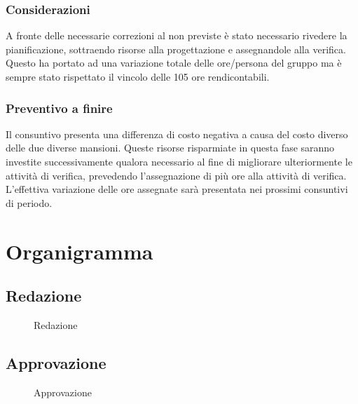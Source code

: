 \subsubsection{Considerazioni}
A fronte delle necessarie correzioni al \PdQ{} non previste è stato necessario rivedere la pianificazione, sottraendo risorse alla progettazione e assegnandole alla verifica. Questo ha portato ad una variazione totale delle ore/persona del gruppo ma è sempre stato rispettato il vincolo delle 105 ore rendicontabili. 

\subsubsection{Preventivo a finire}
Il consuntivo presenta una differenza di costo negativa a causa del costo diverso delle due diverse mansioni. Queste risorse risparmiate in questa fase saranno investite successivamente qualora necessario al fine di migliorare ulteriormente le attività di verifica, prevedendo l'assegnazione di più ore alla attività di verifica. L'effettiva variazione delle ore assegnate sarà presentata nei prossimi consuntivi di periodo.




\section{Organigramma}	\label{sec:organigramma}
\subsection{Redazione}

\begin{figure}[H]
\caption{Redazione}
\end{figure}

\subsection{Approvazione}
\begin{figure}[H]
\caption{Approvazione}
\end{figure}

